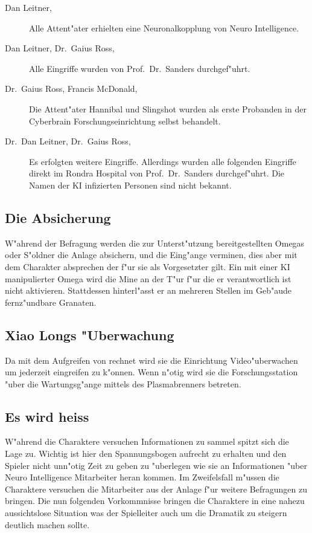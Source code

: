 \begin{description}
	\item[Dan Leitner, \ml{}] Alle Attent"ater erhielten eine Neuronalkopplung von Neuro Intelligence.
	\item[Dan Leitner, Dr.~Gaius Ross, \ml{}] Alle Eingriffe wurden von Prof.~Dr.~Sanders durchgef"uhrt.
	\item[Dr.~Gaius Ross, Francis McDonald, \ml{}] Die Attent"ater Hannibal und Slingshot wurden als erste Probanden in der Cyberbrain 			Forschungseinrichtung selbst behandelt.	
	\item[Dr.~Dan Leitner, Dr.~Gaius Ross, \ml{}] Es erfolgten weitere Eingriffe. Allerdings wurden alle folgenden Eingriffe direkt im 			Rondra Hospital von Prof.~Dr.~Sanders durchgef"uhrt. Die Namen der KI infizierten Personen sind nicht bekannt.
\end{description}

\subsection{Die Absicherung} 
W"ahrend der Befragung werden die zur Unterst"utzung bereitgestellten Omegas oder S"oldner die Anlage absichern, und die Eing"ange verminen, dies aber mit dem Charakter absprechen der f"ur sie als Vorgesetzter gilt. Ein mit einer KI manipulierter Omega wird die Mine an der T"ur f"ur die er verantwortlich ist nicht aktivieren. Stattdessen hinterl"asst er an mehreren Stellen im Geb"aude fernz"undbare Granaten.

\subsection{Xiao Longs "Uberwachung}  
Da \xl{} mit dem Aufgreifen von \ml{} rechnet wird sie die Einrichtung Video"uberwachen um jederzeit eingreifen zu k"onnen. Wenn n"otig wird sie die Forschungsstation "uber die Wartungsg"ange mittels des Plasmabrenners betreten.

\subsection{Es wird heiss} 
W"ahrend die Charaktere versuchen Informationen zu sammel spitzt sich die Lage zu. Wichtig ist hier den Spannungsbogen aufrecht zu erhalten und den Spieler nicht unn"otig Zeit zu geben zu "uberlegen wie sie an Informationen "uber Neuro Intelligence Mitarbeiter heran kommen. Im Zweifelsfall m"ussen die Charaktere versuchen die Mitarbeiter aus der Anlage f"ur weitere Befragungen zu bringen. Die nun folgenden Vorkommnisse bringen die Charaktere in eine nahezu aussichtslose Situation was der Spielleiter auch um die Dramatik zu steigern deutlich machen sollte.

